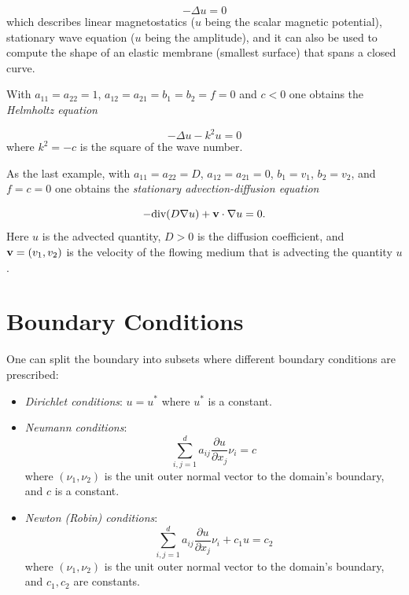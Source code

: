 \documentclass{article}
\begin{document}
$$
-\Delta u = 0
$$ 
which describes linear magnetostatics ($u$ being the scalar magnetic potential),
stationary wave equation ($u$ being the amplitude), and it can also be used 
to compute the shape of an elastic membrane (smallest surface) that spans 
a closed curve.

With $a_{11} = a_{22} = 1$, $a_{12} = a_{21} = b_1 = b_2 = f = 0$
and $c < 0$ one obtains the {\em Helmholtz equation}

$$
-\Delta u - k^2 u = 0
$$ 
where $k^2 = -c$ is the square of the wave number.

As the last example, with $a_{11} = a_{22} = D$, $a_{12} = a_{21} = 0$, $b_1 = v_1$, $b_2 = v_2$, and 
$f = c = 0$ one obtains the {\em stationary advection-diffusion equation}

$$
-\mbox{div}(D \nabla u) + {\bf v}\cdot \nabla u = 0.
$$ 
Here $u$ is the advected quantity, $D > 0$ is the diffusion coefficient, 
and ${\bf v} = (v_1, v_2)$ is the velocity of the flowing medium that is advecting 
the quantity $u$.

\section{Boundary Conditions}

One can split the boundary into subsets where different boundary conditions are 
prescribed:
\begin{itemize}
\item {\em Dirichlet conditions}: $u = u^*$ where $u^*$ is a constant.
\item {\em Neumann conditions}: 
$$
\sum_{i, j = 1}^d a_{ij} \frac{\partial u}{\partial x_j} \nu_i = c
$$
where $(\nu_1, \nu_2)$ is the unit outer normal vector to the domain's boundary, 
and $c$ is a constant.
\item {\em Newton (Robin) conditions}: 
$$
\sum_{i, j = 1}^d a_{ij} \frac{\partial u}{\partial x_j} \nu_i  + c_1 u = c_2
$$
where $(\nu_1, \nu_2)$ is the unit outer normal vector to the domain's boundary, 
and $c_1, c_2$ are constants.
\end{itemize}
\end{document}
